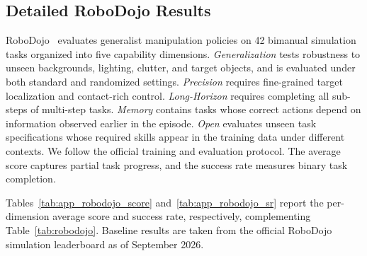 \subsection{Detailed RoboDojo Results}\label{app_robodojo}
RoboDojo~\citep{chen2026robodojo} evaluates generalist manipulation policies on 42 bimanual simulation tasks organized into five capability dimensions. \textit{Generalization} tests robustness to unseen backgrounds, lighting, clutter, and target objects, and is evaluated under both standard and randomized settings. \textit{Precision} requires fine-grained target localization and contact-rich control. \textit{Long-Horizon} requires completing all sub-steps of multi-step tasks. \textit{Memory} contains tasks whose correct actions depend on information observed earlier in the episode. \textit{Open} evaluates unseen task specifications whose required skills appear in the training data under different contexts. We follow the official training and evaluation protocol. The average score captures partial task progress, and the success rate measures binary task completion.

Tables~\ref{tab:app_robodojo_score} and~\ref{tab:app_robodojo_sr} report the per-dimension average score and success rate, respectively, complementing Table~\ref{tab:robodojo}. Baseline results are taken from the official RoboDojo simulation leaderboard as of September 2026.

